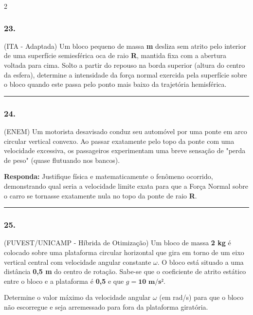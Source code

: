 \documentclass[twoside, 10pt, a4paper]{article}
\newlength{\espacoPreQuestao}\setlength{\espacoPreQuestao}{0.1cm}
\newlength{\espacoQuestao}\setlength{\espacoQuestao}{0.2cm}
\begin{document}
\begin{multicols*}{2}
\subsubsection*{23.} (ITA - Adaptada) Um bloco pequeno de massa \textbf{m} desliza sem atrito pelo interior de uma superfície semiesférica oca de raio \textbf{R}, mantida fixa com a abertura voltada para cima. Solto a partir do repouso na borda superior (altura do centro da esfera), determine a intensidade da força normal exercida pela superfície sobre o bloco quando este passa pelo ponto mais baixo da trajetória hemisférica.
\par\vspace{\espacoQuestao}

\noindent\textcolor{CorLinha}{\rule{\linewidth}{0.5pt}} 
\par\vspace{\espacoPreQuestao}
\subsubsection*{24.} (ENEM) Um motorista desavisado conduz seu automóvel por uma ponte em arco circular vertical convexo. Ao passar exatamente pelo topo da ponte com uma velocidade excessiva, os passageiros experimentam uma breve sensação de "perda de peso" (quase flutuando nos bancos). 

\begin{boxresponda}
\textbf{Responda:} Justifique física e matematicamente o fenômeno ocorrido, demonstrando qual seria a velocidade limite exata para que a Força Normal sobre o carro se tornasse exatamente nula no topo da ponte de raio \textbf{R}.
\end{boxresponda}
\par\vspace{\espacoQuestao}

\noindent\textcolor{CorLinha}{\rule{\linewidth}{0.5pt}} 
\par\vspace{\espacoPreQuestao}
\subsubsection*{25.} (FUVEST/UNICAMP - Híbrida de Otimização) Um bloco de massa \textbf{2 kg} é colocado sobre uma plataforma circular horizontal que gira em torno de um eixo vertical central com velocidade angular constante $\omega$. O bloco está situado a uma distância \textbf{0,5 m} do centro de rotação. Sabe-se que o coeficiente de atrito estático entre o bloco e a plataforma é \textbf{0,5} e que $g = \textbf{10 m/s²}$. 

Determine o valor máximo da velocidade angular $\omega$ (em rad/s) para que o bloco não escorregue e seja arremessado para fora da plataforma giratória.
\par\vspace{\espacoQuestao}

\end{multicols*}
\end{document}
